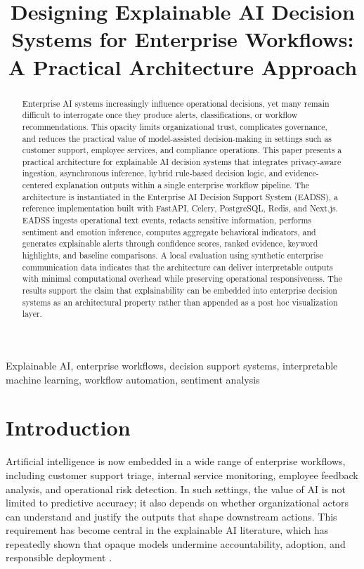 \documentclass[conference]{IEEEtran}
\title{Designing Explainable AI Decision Systems for Enterprise Workflows: A Practical Architecture Approach}
\author{
\IEEEauthorblockN{Mukundhan Mohan}
\IEEEauthorblockA{Enterprise AI Decision Support System (EADSS)}
}
\begin{document}
\maketitle

\begin{abstract}
Enterprise AI systems increasingly influence operational decisions, yet many remain difficult to interrogate once they produce alerts, classifications, or workflow recommendations. This opacity limits organizational trust, complicates governance, and reduces the practical value of model-assisted decision-making in settings such as customer support, employee services, and compliance operations. This paper presents a practical architecture for explainable AI decision systems that integrates privacy-aware ingestion, asynchronous inference, hybrid rule-based decision logic, and evidence-centered explanation outputs within a single enterprise workflow pipeline. The architecture is instantiated in the Enterprise AI Decision Support System (EADSS), a reference implementation built with FastAPI, Celery, PostgreSQL, Redis, and Next.js. EADSS ingests operational text events, redacts sensitive information, performs sentiment and emotion inference, computes aggregate behavioral indicators, and generates explainable alerts through confidence scores, ranked evidence, keyword highlights, and baseline comparisons. A local evaluation using synthetic enterprise communication data indicates that the architecture can deliver interpretable outputs with minimal computational overhead while preserving operational responsiveness. The results support the claim that explainability can be embedded into enterprise decision systems as an architectural property rather than appended as a post hoc visualization layer.
\end{abstract}

\begin{IEEEkeywords}
Explainable AI, enterprise workflows, decision support systems, interpretable machine learning, workflow automation, sentiment analysis
\end{IEEEkeywords}

\section{Introduction}
Artificial intelligence is now embedded in a wide range of enterprise workflows, including customer support triage, internal service monitoring, employee feedback analysis, and operational risk detection. In such settings, the value of AI is not limited to predictive accuracy; it also depends on whether organizational actors can understand and justify the outputs that shape downstream actions. This requirement has become central in the explainable AI literature, which has repeatedly shown that opaque models undermine accountability, adoption, and responsible deployment \cite{adadi2018peeking,guidotti2018survey,arrieta2020explainable}.
\end{document}
